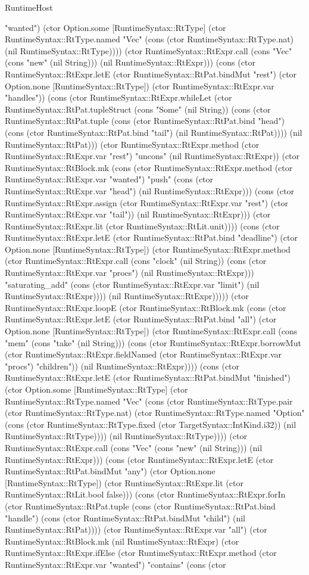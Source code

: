 \begin{lexlean}{RuntimeHost}
\begin{semanticmodule}
{"wanted") (ctor Option.some [RuntimeSyntax::RtType] (ctor RuntimeSyntax::RtType.named "Vec" (cons (ctor RuntimeSyntax::RtType.nat) (nil RuntimeSyntax::RtType)))) (ctor RuntimeSyntax::RtExpr.call (cons "Vec" (cons "new" (nil String))) (nil RuntimeSyntax::RtExpr))) (cons (ctor RuntimeSyntax::RtExpr.letE (ctor RuntimeSyntax::RtPat.bindMut "rest") (ctor Option.none [RuntimeSyntax::RtType]) (ctor RuntimeSyntax::RtExpr.var "handles")) (cons (ctor RuntimeSyntax::RtExpr.whileLet (ctor RuntimeSyntax::RtPat.tupleStruct (cons "Some" (nil String)) (cons (ctor RuntimeSyntax::RtPat.tuple (cons (ctor RuntimeSyntax::RtPat.bind "head") (cons (ctor RuntimeSyntax::RtPat.bind "tail") (nil RuntimeSyntax::RtPat)))) (nil RuntimeSyntax::RtPat))) (ctor RuntimeSyntax::RtExpr.method (ctor RuntimeSyntax::RtExpr.var "rest") "uncons" (nil RuntimeSyntax::RtExpr)) (ctor RuntimeSyntax::RtBlock.mk (cons (ctor RuntimeSyntax::RtExpr.method (ctor RuntimeSyntax::RtExpr.var "wanted") "push" (cons (ctor RuntimeSyntax::RtExpr.var "head") (nil RuntimeSyntax::RtExpr))) (cons (ctor RuntimeSyntax::RtExpr.assign (ctor RuntimeSyntax::RtExpr.var "rest") (ctor RuntimeSyntax::RtExpr.var "tail")) (nil RuntimeSyntax::RtExpr))) (ctor RuntimeSyntax::RtExpr.lit (ctor RuntimeSyntax::RtLit.unit)))) (cons (ctor RuntimeSyntax::RtExpr.letE (ctor RuntimeSyntax::RtPat.bind "deadline") (ctor Option.none [RuntimeSyntax::RtType]) (ctor RuntimeSyntax::RtExpr.method (ctor RuntimeSyntax::RtExpr.call (cons "clock" (nil String)) (cons (ctor RuntimeSyntax::RtExpr.var "procs") (nil RuntimeSyntax::RtExpr))) "saturating_add" (cons (ctor RuntimeSyntax::RtExpr.var "limit") (nil RuntimeSyntax::RtExpr)))) (nil RuntimeSyntax::RtExpr))))) (ctor RuntimeSyntax::RtExpr.loopE (ctor RuntimeSyntax::RtBlock.mk (cons (ctor RuntimeSyntax::RtExpr.letE (ctor RuntimeSyntax::RtPat.bind "all") (ctor Option.none [RuntimeSyntax::RtType]) (ctor RuntimeSyntax::RtExpr.call (cons "mem" (cons "take" (nil String))) (cons (ctor RuntimeSyntax::RtExpr.borrowMut (ctor RuntimeSyntax::RtExpr.fieldNamed (ctor RuntimeSyntax::RtExpr.var "procs") "children")) (nil RuntimeSyntax::RtExpr)))) (cons (ctor RuntimeSyntax::RtExpr.letE (ctor RuntimeSyntax::RtPat.bindMut "finished") (ctor Option.some [RuntimeSyntax::RtType] (ctor RuntimeSyntax::RtType.named "Vec" (cons (ctor RuntimeSyntax::RtType.pair (ctor RuntimeSyntax::RtType.nat) (ctor RuntimeSyntax::RtType.named "Option" (cons (ctor RuntimeSyntax::RtType.fixed (ctor TargetSyntax::IntKind.i32)) (nil RuntimeSyntax::RtType)))) (nil RuntimeSyntax::RtType)))) (ctor RuntimeSyntax::RtExpr.call (cons "Vec" (cons "new" (nil String))) (nil RuntimeSyntax::RtExpr))) (cons (ctor RuntimeSyntax::RtExpr.letE (ctor RuntimeSyntax::RtPat.bindMut "any") (ctor Option.none [RuntimeSyntax::RtType]) (ctor RuntimeSyntax::RtExpr.lit (ctor RuntimeSyntax::RtLit.bool false))) (cons (ctor RuntimeSyntax::RtExpr.forIn (ctor RuntimeSyntax::RtPat.tuple (cons (ctor RuntimeSyntax::RtPat.bind "handle") (cons (ctor RuntimeSyntax::RtPat.bindMut "child") (nil RuntimeSyntax::RtPat)))) (ctor RuntimeSyntax::RtExpr.var "all") (ctor RuntimeSyntax::RtBlock.mk (nil RuntimeSyntax::RtExpr) (ctor RuntimeSyntax::RtExpr.ifElse (ctor RuntimeSyntax::RtExpr.method (ctor RuntimeSyntax::RtExpr.var "wanted") "contains" (cons (ctor }
\end{semanticmodule}
\end{lexlean}
